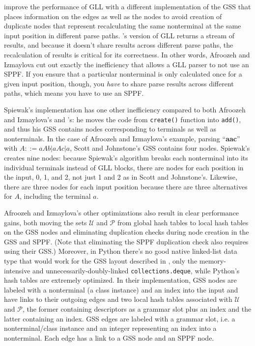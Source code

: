 \documentclass[12pt]{article}
\begin{document}
\textcite{afroozeh_izmaylova} improve the performance of GLL with a
different implementation of the GSS that places information on the
edges as well as the nodes to avoid creation of duplicate nodes that
represent recalculating the same nonterminal at the same input
position in different parse paths.  \textcite{spiewak}'s version of
GLL returns a stream of results, and because it doesn't share results
across different parse paths, the recalculation of results is critical
for its correctness.  In other words, Afroozeh and Izmaylova cut out
exactly the inefficiency that allows a GLL parser to not use an SPPF.
If you ensure that a particular nonterminal is only calculated once
for a given input position, though, you \emph{have} to share parse
results across different paths, which means you have to use an SPPF.

Spiewak's implementation has one other inefficiency compared to both
Afroozeh and Izmaylova's and \textcite{gll2}'s: he moves the code from
\texttt{create()} function into \texttt{add()}, and thus his GSS
contains nodes corresponding to terminals as well as nonterminals.  In
the case of Afroozeh and Izmaylova's example, parsing ``\textbf{aac}''
with $A ::= aAb | aAc | a$, Scott and Johnstone's GSS contains four
nodes.  Spiewak's creates nine nodes: because Spiewak's algorithm
breaks each nonterminal into its individual terminals instead of GLL
blocks, there are nodes for each position in the input, 0, 1, and 2,
not just 1 and 2 as in Scott and Johnstone's.  Likewise, there are
three nodes for each input position because there are three
alternatives for $A$, including the terminal $a$.

Afroozeh and Izmaylova's other optimizations also result in clear
performance gains, both moving the sets $\mathcal{U}$ and
$\mathcal{P}$ from global hash tables to local hash tables on the GSS
nodes and eliminating duplication checks during node creation in the
GSS and SPPF.  (Note that eliminating the SPPF duplication check also
requires using their GSS.)  Moreover, in Python there's no good native
linked-list data type that would work for the GSS layout described in
\textcite{gll2}, only the memory-intensive and
unnecessarily-doubly-linked \texttt{collections.deque}, while Python's
hash tables are extremely optimized.  In their implementation, GSS
nodes are labeled with a nonterminal (a class instance) and an index
into the input and have links to their outgoing edges and two local
hash tables associated with $\mathcal{U}$ and $\mathcal{P}$, the
former containing descriptors as a grammar slot plus an index and the
latter containing an index.  GSS edges are labeled with a grammar
slot, i.e. a nonterminal/class instance and an integer representing an
index into a nonterminal.  Each edge has a link to a GSS node and an
SPPF node.
\end{document}
